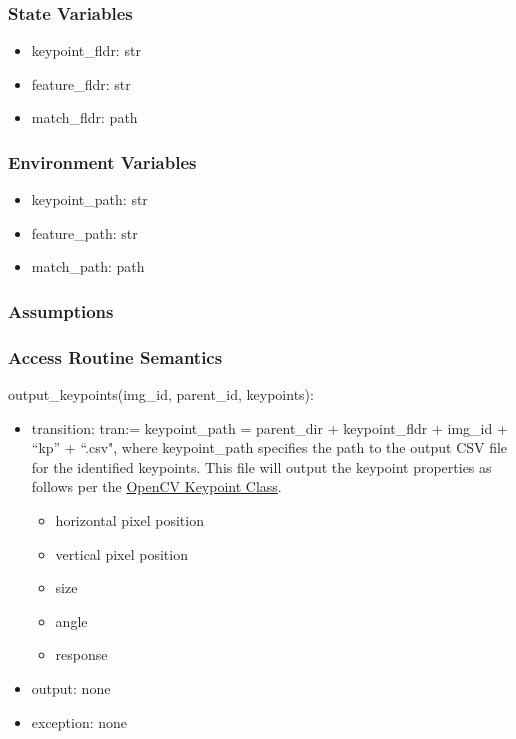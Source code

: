 \documentclass[12pt, titlepage]{article}
\begin{document}
  \subsubsection{State Variables}
  \begin{itemize}
    \item keypoint\_fldr: str
    \item feature\_fldr: str
    \item match\_fldr: path
  \end{itemize}
  
  \subsubsection{Environment Variables}
  \begin{itemize}
    \item keypoint\_path: str
    \item feature\_path: str
    \item match\_path: path
  \end{itemize}
  
  
  \subsubsection{Assumptions}
  
  
  \subsubsection{Access Routine Semantics}
  
  \noindent output\_keypoints(img\_id, parent\_id, keypoints):
  \begin{itemize}
    \item transition: tran:= keypoint\_path = parent\_dir + keypoint\_fldr + img\_id + ``kp'' + ``.csv", where keypoint\_path specifies the 
    path to the output CSV file for the identified keypoints. This file will output the keypoint properties as follows 
    per the \href{https://docs.opencv.org/3.4/d2/d29/classcv_1_1KeyPoint.html}{OpenCV Keypoint Class}.
  
    \begin{itemize}
      \item horizontal pixel position
      \item vertical pixel position
      \item size 
      \item angle
      \item response 
    \end{itemize}
  \item output: none 
  \item exception: none 
  \end{itemize}
  
\end{document}
